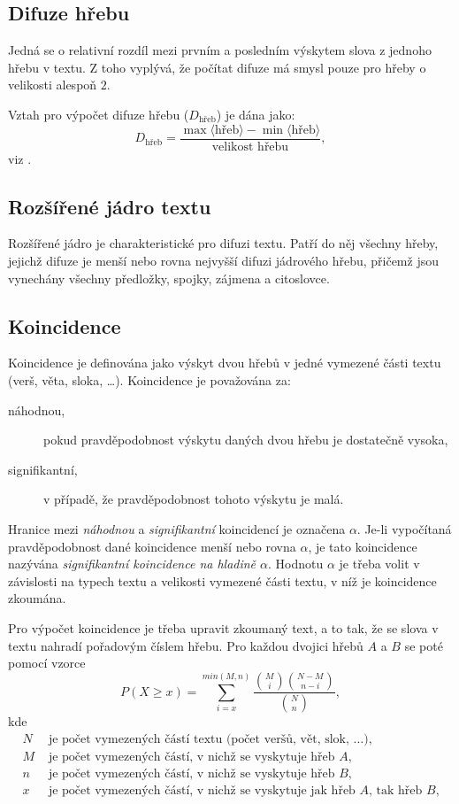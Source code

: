 \documentclass[dp.tex]{subfiles}
\begin{document}
\subsection{Difuze hřebu}
Jedná se o relativní rozdíl mezi prvním a posledním výskytem slova z jednoho hřebu v textu. Z toho vyplývá, že počítat difuze má smysl pouze pro hřeby o velikosti alespoň $2$.

Vztah pro výpočet difuze hřebu ($D_{\text{hřeb}}$) je dána jako:
\begin{equation}
D_\text{hřeb}=\frac{\max{\langle\text{hřeb}\rangle}-\min{\langle\text{hřeb}\rangle}}{\text{velikost hřebu}},
\end{equation}
viz \cite[str. 304]{Wimmer2003}.
\subsection{Rozšířené jádro textu}
Rozšířené jádro je charakteristické pro difuzi textu. Patří do něj všechny hřeby, jejichž difuze je menší nebo rovna nejvyšší difuzi jádrového hřebu, přičemž jsou vynechány všechny předložky, spojky, zájmena a citoslovce.

\subsection{Koincidence}
Koincidence je definována jako výskyt dvou hřebů v jedné vymezené části textu (verš, věta, sloka, \ldots). Koincidence je považována za:
\begin{description}
\item[náhodnou,] pokud pravděpodobnost výskytu daných dvou hřebu je dostatečně vysoka,
\item[signifikantní,] v případě, že pravděpodobnost tohoto výskytu je malá.
\end{description}

Hranice mezi \textit{náhodnou} a \textit{signifikantní} koincidencí je označena $\alpha $. Je-li vypočítaná pravděpodobnost dané koincidence menší nebo rovna $\alpha $, je tato koincidence nazývána \textit{signifikantní koincidence na hladině $\alpha $}. Hodnotu $\alpha $ je třeba volit v závislosti na typech textu a velikosti vymezené části textu, v níž je koincidence zkoumána.

Pro výpočet koincidence je třeba upravit zkoumaný text, a to tak, že se slova v textu nahradí pořadovým číslem hřebu. Pro každou dvojici hřebů $A$ a $B$ se poté pomocí vzorce
\begin{equation}
P(X \geq x)=\sum_{i=x}^{min{\left(  M, n \right) }} \frac{\binom{M}{i}\binom{N-M}{n-i}}{\binom{N}{n}},
\end{equation}
kde 
\begin{align*}
	N & \text{ je počet vymezených částí textu (počet veršů, vět, slok, \ldots),}\\
	M & \text{ je počet vymezených částí, v nichž se vyskytuje hřeb $A$,}\\
	n & \text{ je počet vymezených částí, v nichž se vyskytuje hřeb $B$,}\\
	x & \text{ je počet vymezených částí, v nichž se vyskytuje jak hřeb  $A$, tak hřeb $B$,}
\end{align*}  
\end{document}
